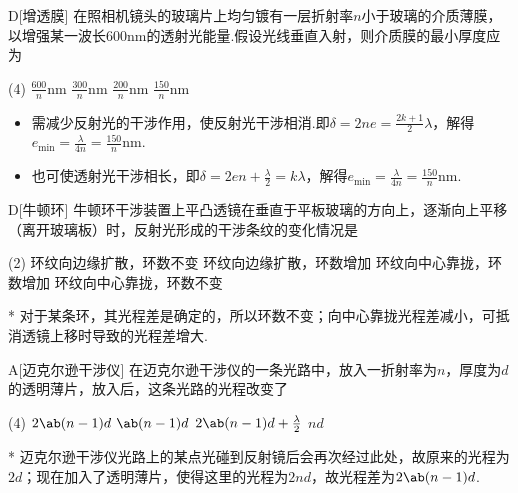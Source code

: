 \begin{choice}{D}[增透膜]
    在照相机镜头的玻璃片上均匀镀有一层折射率$n$小于玻璃的介质薄膜，以增强某一波长$600\mathrm{nm}$的透射光能量.假设光线垂直入射，则介质膜的最小厚度应为
    \begin{tasks}(4)
        \task $\frac{600}{n}\mathrm{nm}$
        \task $\frac{300}{n}\mathrm{nm}$
        \task $\frac{200}{n}\mathrm{nm}$
        \task $\frac{150}{n}\mathrm{nm}$
    \end{tasks}
\end{choice}
\begin{solution}
    \begin{itemize}
        \item 需减少反射光的干涉作用，使反射光干涉相消.即$\delta=2ne=\frac{2k+1}{2}\lambda$，解得$e_{\min}=\frac{\lambda}{4n}=\frac{150}{n}\mathrm{nm}$.
        \item 也可使透射光干涉相长，即$\delta=2en+\frac{\lambda}{2}=k\lambda$，解得$e_{\min}=\frac{\lambda}{4n}=\frac{150}{n}\mathrm{nm}$.
    \end{itemize}
\end{solution}

\begin{choice}{D}[牛顿环]
    牛顿环干涉装置上平凸透镜在垂直于平板玻璃的方向上，逐渐向上平移（离开玻璃板）时，反射光形成的干涉条纹的变化情况是
    \begin{tasks}(2)
        \task 环纹向边缘扩散，环数不变
        \task 环纹向边缘扩散，环数增加
        \task 环纹向中心靠拢，环数增加
        \task 环纹向中心靠拢，环数不变
    \end{tasks}
\end{choice}
\begin{solution}*
    对于某条环，其光程差是确定的，所以环数不变；向中心靠拢光程差减小，可抵消透镜上移时导致的光程差增大.
\end{solution}

\begin{choice}{A}[迈克尔逊干涉仪]
    在迈克尔逊干涉仪的一条光路中，放入一折射率为$n$，厚度为$d$的透明薄片，放入后，这条光路的光程改变了
    \begin{tasks}(4)
        \task $2\ab(n-1)d$
        \task $\ab(n-1)d$
        \task $2\ab(n-1)d+\frac{\lambda}{2}$
        \task $nd$
    \end{tasks}
\end{choice}
\begin{solution}*
    迈克尔逊干涉仪光路上的某点光碰到反射镜后会再次经过此处，故原来的光程为$2d$；现在加入了透明薄片，使得这里的光程为$2nd$，故光程差为$2\ab(n-1)d$.
\end{solution}

